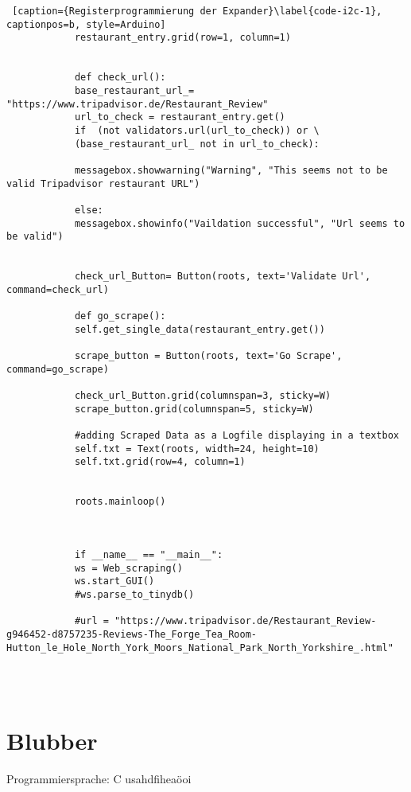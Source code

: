 \documentclass[a4paper,oneside,12pt]{report}
\begin{document}
\begin{lstlisting} [caption={Registerprogrammierung der Expander}\label{code-i2c-1}, captionpos=b, style=Arduino]
			restaurant_entry.grid(row=1, column=1)
			
			
			def check_url():
			base_restaurant_url_= "https://www.tripadvisor.de/Restaurant_Review"
			url_to_check = restaurant_entry.get()
			if  (not validators.url(url_to_check)) or \
			(base_restaurant_url_ not in url_to_check):
			
			messagebox.showwarning("Warning", "This seems not to be valid Tripadvisor restaurant URL")
			
			else:
			messagebox.showinfo("Vaildation successful", "Url seems to be valid")
			
			
			check_url_Button= Button(roots, text='Validate Url', command=check_url)
			
			def go_scrape():
			self.get_single_data(restaurant_entry.get())
			
			scrape_button = Button(roots, text='Go Scrape', command=go_scrape)
			
			check_url_Button.grid(columnspan=3, sticky=W)
			scrape_button.grid(columnspan=5, sticky=W)
			
			#adding Scraped Data as a Logfile displaying in a textbox
			self.txt = Text(roots, width=24, height=10)
			self.txt.grid(row=4, column=1)
			
			
			roots.mainloop()
			
			
			
			if __name__ == "__main__":
			ws = Web_scraping()
			ws.start_GUI()
			#ws.parse_to_tinydb()
			
			#url = "https://www.tripadvisor.de/Restaurant_Review-g946452-d8757235-Reviews-The_Forge_Tea_Room-Hutton_le_Hole_North_York_Moors_National_Park_North_Yorkshire_.html"
			
			
			     
			\end{lstlisting}

		
		
		
		
		
		
		
	\chapter{Blubber}\label{bluber}	
	
		Programmiersprache: C	
		usahdfiheaöoi
				
			

		

		
			
		
	
	
	
\end{document}
